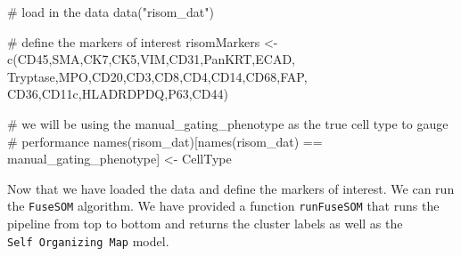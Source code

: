 \documentclass[
  letterpaper,
  DIV=11,
  numbers=noendperiod]{scrreprt}
\newenvironment{Shaded}{\begin{snugshade}}{\end{snugshade}}
\newcommand{\CommentTok}[1]{\textcolor[rgb]{0.37,0.37,0.37}{#1}}
\newcommand{\FunctionTok}[1]{\textcolor[rgb]{0.28,0.35,0.67}{#1}}
\newcommand{\NormalTok}[1]{\textcolor[rgb]{0.00,0.23,0.31}{#1}}
\newcommand{\OtherTok}[1]{\textcolor[rgb]{0.00,0.23,0.31}{#1}}
\newcommand{\SpecialCharTok}[1]{\textcolor[rgb]{0.37,0.37,0.37}{#1}}
\newcommand{\StringTok}[1]{\textcolor[rgb]{0.13,0.47,0.30}{#1}}
\begin{document}
\begin{Shaded}
\begin{Highlighting}[]
\CommentTok{\# load in the data}
\FunctionTok{data}\NormalTok{(}\StringTok{"risom\_dat"}\NormalTok{)}

\CommentTok{\# define the markers of interest}
\NormalTok{risomMarkers }\OtherTok{\textless{}{-}} \FunctionTok{c}\NormalTok{(}\StringTok{\textquotesingle{}CD45\textquotesingle{}}\NormalTok{,}\StringTok{\textquotesingle{}SMA\textquotesingle{}}\NormalTok{,}\StringTok{\textquotesingle{}CK7\textquotesingle{}}\NormalTok{,}\StringTok{\textquotesingle{}CK5\textquotesingle{}}\NormalTok{,}\StringTok{\textquotesingle{}VIM\textquotesingle{}}\NormalTok{,}\StringTok{\textquotesingle{}CD31\textquotesingle{}}\NormalTok{,}\StringTok{\textquotesingle{}PanKRT\textquotesingle{}}\NormalTok{,}\StringTok{\textquotesingle{}ECAD\textquotesingle{}}\NormalTok{,}
                   \StringTok{\textquotesingle{}Tryptase\textquotesingle{}}\NormalTok{,}\StringTok{\textquotesingle{}MPO\textquotesingle{}}\NormalTok{,}\StringTok{\textquotesingle{}CD20\textquotesingle{}}\NormalTok{,}\StringTok{\textquotesingle{}CD3\textquotesingle{}}\NormalTok{,}\StringTok{\textquotesingle{}CD8\textquotesingle{}}\NormalTok{,}\StringTok{\textquotesingle{}CD4\textquotesingle{}}\NormalTok{,}\StringTok{\textquotesingle{}CD14\textquotesingle{}}\NormalTok{,}\StringTok{\textquotesingle{}CD68\textquotesingle{}}\NormalTok{,}\StringTok{\textquotesingle{}FAP\textquotesingle{}}\NormalTok{,}
                   \StringTok{\textquotesingle{}CD36\textquotesingle{}}\NormalTok{,}\StringTok{\textquotesingle{}CD11c\textquotesingle{}}\NormalTok{,}\StringTok{\textquotesingle{}HLADRDPDQ\textquotesingle{}}\NormalTok{,}\StringTok{\textquotesingle{}P63\textquotesingle{}}\NormalTok{,}\StringTok{\textquotesingle{}CD44\textquotesingle{}}\NormalTok{)}

\CommentTok{\# we will be using the manual\_gating\_phenotype as the true cell type to gauge }
\CommentTok{\# performance}
\FunctionTok{names}\NormalTok{(risom\_dat)[}\FunctionTok{names}\NormalTok{(risom\_dat) }\SpecialCharTok{==} \StringTok{\textquotesingle{}manual\_gating\_phenotype\textquotesingle{}}\NormalTok{] }\OtherTok{\textless{}{-}} \StringTok{\textquotesingle{}CellType\textquotesingle{}}
\end{Highlighting}
\end{Shaded}

Now that we have loaded the data and define the markers of interest. We
can run the \texttt{FuseSOM} algorithm. We have provided a function
\texttt{runFuseSOM} that runs the pipeline from top to bottom and
returns the cluster labels as well as the \texttt{Self\ Organizing\ Map}
model.
\end{document}
